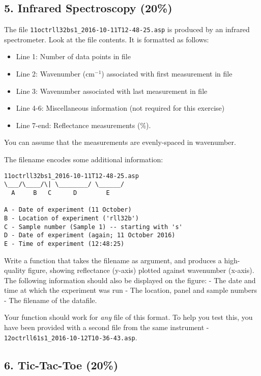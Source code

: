 \documentclass[11pt]{article}
\providecommand{\tightlist}{%
      \setlength{\itemsep}{0pt}\setlength{\parskip}{0pt}}
\begin{document}
    \hypertarget{infrared-spectroscopy-20}{%
\subsection*{5. Infrared Spectroscopy
(20\%)}\label{infrared-spectroscopy-20}}

The file \texttt{11octrll32bs1\_2016-10-11T12-48-25.asp} is produced by
an infrared spectrometer. Look at the file contents. It is formatted as
follows:

\begin{itemize}
\tightlist
\item
  Line 1: Number of data points in file
\item
  Line 2: Wavenumber (cm\({}^{-1}\)) associated with first measurement
  in file
\item
  Line 3: Wavenumber associated with last measurement in file
\item
  Line 4-6: Miscellaneous information (not required for this exercise)
\item
  Line 7-end: Reflectance measurements (\%).
\end{itemize}

You can assume that the measurements are evenly-spaced in wavenumber.

The filename encodes some additional information:

\begin{verbatim}
11octrll32bs1_2016-10-11T12-48-25.asp
\___/\____/\| \________/ \______/
  A     B   C      D        E
  
A - Date of experiment (11 October)
B - Location of experiment ('rll32b')
C - Sample number (Sample 1) -- starting with 's'
D - Date of experiment (again; 11 October 2016)
E - Time of experiment (12:48:25)
\end{verbatim}

Write a function that takes the filename as argument, and produces a
high-quality figure, showing reflectance (y-axis) plotted against
wavenumber (x-axis). The following information should also be displayed
on the figure: - The date and time at which the experiment was run - The
location, panel and sample numbers - The filename of the datafile.

Your function should work for \emph{any} file of this format. To help
you test this, you have been provided with a second file from the same
instrument - \texttt{12octrll61s1\_2016-10-12T10-36-43.asp}.

    \hypertarget{tic-tac-toe-20}{%
\subsection*{6. Tic-Tac-Toe (20\%)}\label{tic-tac-toe-20}}
\end{document}
